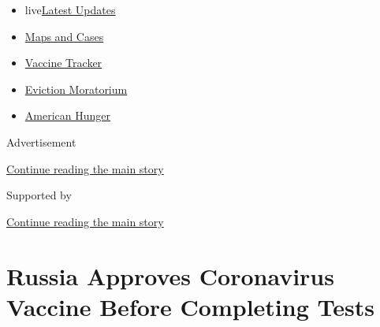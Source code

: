 \begin{itemize}
\tightlist
\item
  live\href{https://www.nytimes3xbfgragh.onion/2020/09/05/world/coronavirus-covid.html?name=styln-coronavirus-national\&region=TOP_BANNER\&block=storyline_menu_recirc\&action=click\&pgtype=Article\&impression_id=aa23ca21-efb6-11ea-bbc0-9feac4622442\&variant=undefined}{Latest
  Updates}
\item
  \href{https://www.nytimes3xbfgragh.onion/interactive/2020/us/coronavirus-us-cases.html?name=styln-coronavirus-national\&region=TOP_BANNER\&block=storyline_menu_recirc\&action=click\&pgtype=Article\&impression_id=aa23ca22-efb6-11ea-bbc0-9feac4622442\&variant=undefined}{Maps
  and Cases}
\item
  \href{https://www.nytimes3xbfgragh.onion/interactive/2020/science/coronavirus-vaccine-tracker.html?name=styln-coronavirus-national\&region=TOP_BANNER\&block=storyline_menu_recirc\&action=click\&pgtype=Article\&impression_id=aa23ca23-efb6-11ea-bbc0-9feac4622442\&variant=undefined}{Vaccine
  Tracker}
\item
  \href{https://www.nytimes3xbfgragh.onion/2020/09/02/your-money/eviction-moratorium-covid.html?name=styln-coronavirus-national\&region=TOP_BANNER\&block=storyline_menu_recirc\&action=click\&pgtype=Article\&impression_id=aa23ca24-efb6-11ea-bbc0-9feac4622442\&variant=undefined}{Eviction
  Moratorium}
\item
  \href{https://www.nytimes3xbfgragh.onion/interactive/2020/09/02/magazine/food-insecurity-hunger-us.html?name=styln-coronavirus-national\&region=TOP_BANNER\&block=storyline_menu_recirc\&action=click\&pgtype=Article\&impression_id=aa23ca25-efb6-11ea-bbc0-9feac4622442\&variant=undefined}{American
  Hunger}
\end{itemize}

Advertisement

\protect\hyperlink{after-top}{Continue reading the main story}

Supported by

\protect\hyperlink{after-sponsor}{Continue reading the main story}

\hypertarget{russia-approves-coronavirus-vaccine-before-completing-tests}{%
\section{Russia Approves Coronavirus Vaccine Before Completing
Tests}\label{russia-approves-coronavirus-vaccine-before-completing-tests}}

